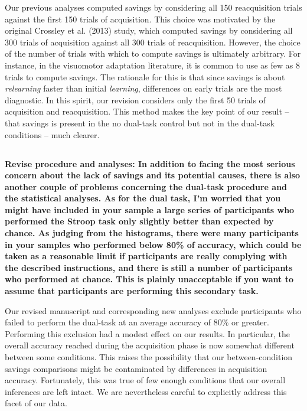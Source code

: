 \documentclass[10pt,a4paper]{article} \usepackage{amsmath} \usepackage{parskip}
\begin{document}
Our previous analyses computed savings by considering all 150 reacquisition
trials against the first 150 trials of acquisition. This choice was motivated by
the original Crossley et al. (2013) study, which computed savings by considering
all 300 trials of acquisition against all 300 trials of reacquisition. However,
the choice of the number of trials with which to compute savings is ultimately
arbitrary. For instance, in the visuomotor adaptation literature, it is common
to use as few as 8 trials to compute savings. The rationale for this is that
since savings is about \emph{relearning} faster than initial \emph{learning},
differences on early trials are the most diagnostic. In this spirit, our
revision considers only the first 50 trials of acquisition and reacquisition.
This method makes the key point of our result -- that savings is present in the
no dual-task control but not in the dual-task conditions -- much clearer.

\subsection{} \textbf{Revise procedure and analyses: In addition to facing the
most serious concern about the lack of savings and its potential causes, there
is also another couple of problems concerning the dual-task procedure and the
statistical analyses. As for the dual task, I'm worried that you might have
included in your sample a large series of participants who performed the Stroop
task only slightly better than expected by chance. As judging from the
histograms, there were many participants in your samples who performed below
80\% of accuracy, which could be taken as a reasonable limit if participants are
really complying with the described instructions, and there is still a number of
participants who performed at chance. This is plainly unacceptable if you want
to assume that participants are performing this secondary task.}

Our revised manuscript and corresponding new analyses exclude participants who
failed to perform the dual-task at an average accuracy of 80\% or greater.
Performing this exclusion had a modest effect on our results. In particular, the
overall accuracy reached during the acquisition phase is now somewhat different
between some conditions. This raises the possibility that our between-condition
savings comparisons might be contaminated by differences in acquisition
accuracy. Fortunately, this was true of few enough conditions that our overall
inferences are left intact. We are nevertheless careful to explicitly address
this facet of our data.
\end{document}
